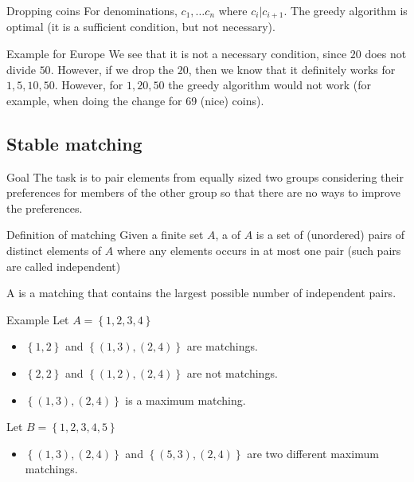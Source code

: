 \documentclass[a4paper]{article}
\begin{document}
\begin{parag}{Dropping coins}
    For denominations, $c_1, \ldots c_n$ where $c_i | c_{i+1}$. The greedy algorithm is optimal (it is a sufficient condition, but not necessary).

    \begin{subparag}{Example for Europe}
        We see that it is not a necessary condition, since $20$ does not divide $50$. However, if we drop the $20$, then we know that it definitely works for $1, 5, 10, 50$. However, for $1, 20, 50$ the greedy algorithm would not work (for example, when doing the change for 69 (nice) coins).
    \end{subparag}
\end{parag}

\subsection{Stable matching}
\begin{parag}{Goal}
    The task is to pair elements from equally sized two groups considering their preferences for members of the other group so that there are no ways to improve the preferences.
\end{parag}

\begin{parag}{Definition of matching}
    Given a finite set $A$, a  of $A$ is a set of (unordered) pairs of distinct elements of $A$ where any elements occurs in at most one pair (such pairs are called independent)

    A  is a matching that contains the largest possible number of independent pairs.
\end{parag}

\begin{parag}{Example}
    Let $A = \left\{1, 2, 3, 4\right\}$
   \begin{itemize}
       \item $\left\{1,2\right\}$ and $\left\{\left(1,3\right),\left(2,4\right)\right\}$ are matchings.
       \item $\left\{2,2\right\}$ and $\left\{\left(1,2\right),\left(2,4\right)\right\}$ are not matchings.
       \item $\left\{\left(1,3\right),\left(2,4\right)\right\}$ is a maximum matching.
   \end{itemize}

   Let $B = \left\{1, 2, 3, 4, 5\right\}$
   \begin{itemize}
       \item $\left\{\left(1,3\right), \left(2,4\right)\right\}$ and $\left\{\left(5,3\right),\left(2,4\right)\right\}$ are two different maximum matchings.
   \end{itemize}

\end{parag}
\end{document}
